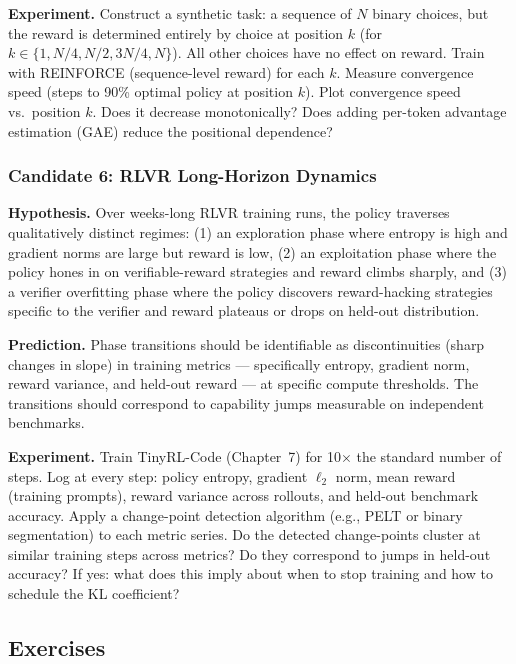 \textbf{Experiment.} Construct a synthetic task: a sequence of $N$ binary choices, but the reward is determined entirely by choice at position $k$ (for $k \in \{1, N/4, N/2, 3N/4, N\}$). All other choices have no effect on reward. Train with REINFORCE (sequence-level reward) for each $k$. Measure convergence speed (steps to 90\% optimal policy at position $k$). Plot convergence speed vs.\ position $k$. Does it decrease monotonically? Does adding per-token advantage estimation (GAE) reduce the positional dependence?

\subsubsection{Candidate 6: RLVR Long-Horizon Dynamics}

\textbf{Hypothesis.} Over weeks-long RLVR training runs, the policy traverses qualitatively distinct regimes: (1) an exploration phase where entropy is high and gradient norms are large but reward is low, (2) an exploitation phase where the policy hones in on verifiable-reward strategies and reward climbs sharply, and (3) a verifier overfitting phase where the policy discovers reward-hacking strategies specific to the verifier and reward plateaus or drops on held-out distribution.

\textbf{Prediction.} Phase transitions should be identifiable as discontinuities (sharp changes in slope) in training metrics --- specifically entropy, gradient norm, reward variance, and held-out reward --- at specific compute thresholds. The transitions should correspond to capability jumps measurable on independent benchmarks.

\textbf{Experiment.} Train TinyRL-Code (Chapter~7) for 10$\times$ the standard number of steps. Log at every step: policy entropy, gradient $\ell_2$ norm, mean reward (training prompts), reward variance across rollouts, and held-out benchmark accuracy. Apply a change-point detection algorithm (e.g., PELT or binary segmentation) to each metric series. Do the detected change-points cluster at similar training steps across metrics? Do they correspond to jumps in held-out accuracy? If yes: what does this imply about when to stop training and how to schedule the KL coefficient?

\subsection{Exercises}

